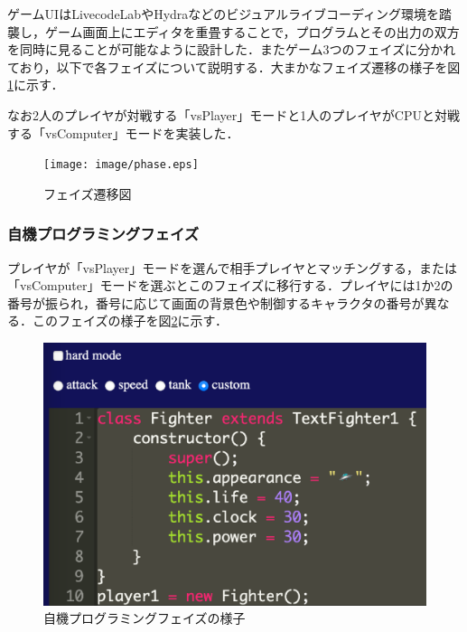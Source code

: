 ゲームUIはLivecodeLab\cite{livecodelab}やHydra\cite{hydra}などのビジュアルライブコーディング環境を踏襲し，ゲーム画面上にエディタを重畳することで，プログラムとその出力の双方を同時に見ることが可能なように設計した．またゲーム3つのフェイズに分かれており，以下で各フェイズについて説明する．大まかなフェイズ遷移の様子を図\ref{phase}に示す．

なお2人のプレイヤが対戦する「vsPlayer」モードと1人のプレイヤがCPUと対戦する「vsComputer」モードを実装した．

\begin{figure}[!b]
  \begin{center}
    \texttt{[image: image/phase.eps]}
  \end{center}
    \vspace{-8mm} 
  \caption{フェイズ遷移図}
  \label{phase}
\end{figure}

\subsubsection{自機プログラミングフェイズ}
プレイヤが「vsPlayer」モードを選んで相手プレイヤとマッチングする，または「vsComputer」モードを選ぶとこのフェイズに移行する．プレイヤには1か2の番号が振られ，番号に応じて画面の背景色や制御するキャラクタの番号が異なる．このフェイズの様子を図\ref{characterProgramming}に示す．

\begin{figure}[!ht]
  \begin{center}
    \includegraphics[width=0.8\linewidth]{image/characterProgramming.eps}
  \end{center}
    \vspace{-8mm} 
  \caption{自機プログラミングフェイズの様子}
  \label{characterProgramming}
\end{figure}

